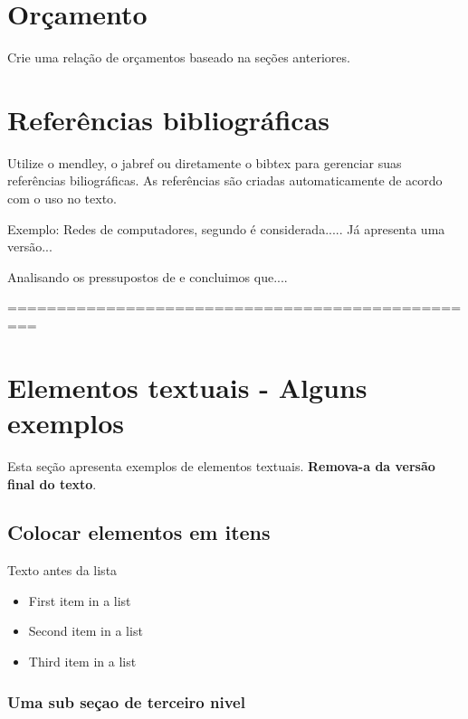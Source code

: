 \documentclass[	DIV=calc,%
							paper=a4,%
							fontsize=12pt,%
							onecolumn]{scrartcl}	 					%
\begin{document}
\section{Orçamento}
Crie uma relação de orçamentos baseado na seções anteriores.

\section{Referências bibliográficas}
Utilize o mendley, o jabref ou diretamente o bibtex para gerenciar suas referências biliográficas. As referências são criadas automaticamente de acordo com o uso no texto.

Exemplo: Redes de computadores, segundo \cite{t2013} é considerada..... Já \cite{kurose2010} apresenta uma versão...

Analisando os pressupostos de \cite{ref3} e \cite{ref4} concluimos que....


\renewcommand\refname{} %

  

=================================================
\section{Elementos textuais - Alguns exemplos}

Esta seção apresenta exemplos de elementos textuais. \textbf{Remova-a da versão final do texto}.


\subsection{Colocar elementos em itens}

Texto antes da lista

\begin{itemize}
	\item First item in a list 
	\item Second item in a list 
	\item Third item in a list
\end{itemize}

\subsubsection{Uma sub seçao de terceiro nivel}
\end{document}
